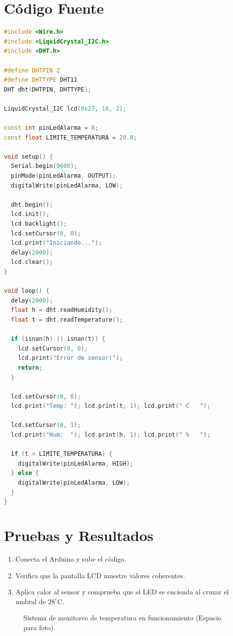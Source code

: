 \documentclass[12pt,a4paper]{article}
\begin{document}
\section{Código Fuente}
\begin{lstlisting}[language=C++]
#include <Wire.h>
#include <LiquidCrystal_I2C.h>
#include <DHT.h>

#define DHTPIN 2       
#define DHTTYPE DHT11  
DHT dht(DHTPIN, DHTTYPE);

LiquidCrystal_I2C lcd(0x27, 16, 2);

const int pinLedAlarma = 8;
const float LIMITE_TEMPERATURA = 28.0; 

void setup() {
  Serial.begin(9600);
  pinMode(pinLedAlarma, OUTPUT);
  digitalWrite(pinLedAlarma, LOW);

  dht.begin();
  lcd.init();
  lcd.backlight();
  lcd.setCursor(0, 0);
  lcd.print("Iniciando...");
  delay(2000);
  lcd.clear();
}

void loop() {
  delay(2000);
  float h = dht.readHumidity();
  float t = dht.readTemperature();

  if (isnan(h) || isnan(t)) {
    lcd.setCursor(0, 0);
    lcd.print("Error de sensor!");
    return;
  }

  lcd.setCursor(0, 0);
  lcd.print("Temp: "); lcd.print(t, 1); lcd.print(" C   ");

  lcd.setCursor(0, 1);
  lcd.print("Hum:  "); lcd.print(h, 1); lcd.print(" %   ");

  if (t > LIMITE_TEMPERATURA) {
    digitalWrite(pinLedAlarma, HIGH);
  } else {
    digitalWrite(pinLedAlarma, LOW);
  }
}
\end{lstlisting}

\section{Pruebas y Resultados}
\begin{enumerate}
    \item Conecta el Arduino y sube el código.
    \item Verifica que la pantalla LCD muestre valores coherentes.
    \item Aplica calor al sensor y comprueba que el LED se encienda al cruzar el umbral de $28^\circ\text{C}$.
\end{enumerate}

\begin{figure}[h]
    \centering
    \caption{Sistema de monitoreo de temperatura en funcionamiento (Espacio para foto).}
\end{figure}
\end{document}
